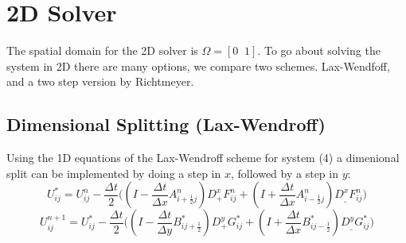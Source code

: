 
\section{2D Solver}
The spatial domain for the 2D solver is $\Omega=[0\;\;1]$. To go about solving the system in 2D there are many options,
we compare two schemes. Lax-Wendfoff, and a two step version by Richtmeyer. \newline

\subsection{Dimensional Splitting (Lax-Wendroff)}

Using the 1D equations of the Lax-Wendroff scheme for system (4) a dimenional split can be implemented by 
doing a step in $x$, followed by a step in $y$: 
\begin{equation}\label{eqn:6}
U_{ij}^* = U_{ij}^n - \frac{\Delta t}{2} 
\bigg(( I- \frac{\Delta t}{\Delta x} A_{i+\frac{1}{2}j}^n ) D_+^xF_{ij}^n 
+ (I+ \frac{\Delta t}{\Delta x} A_{i-\frac{1}{2}j}^n) D_{\_}^xF_{ij}^n\bigg)
\end{equation}
\begin{equation}\label{eqn:7}
U_{ij}^{n+1} = U_{ij}^* - 
\frac{\Delta t}{2} \bigg((I - \frac{\Delta t}{\Delta y} B_{ij+\frac{1}{2}}^*) D_+^yG_{ij}^*
 +(I + \frac{\Delta t}{\Delta x} B_{ij-\frac{1}{2}}^*) D_{\_}^y G_{ij}^* \bigg)
\end{equation}

